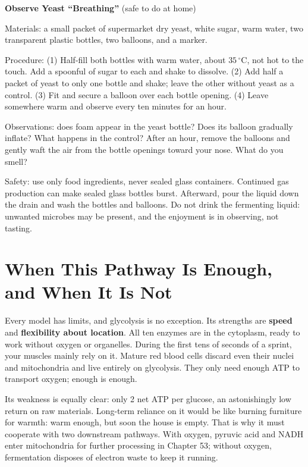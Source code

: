 \begin{shiyan}
\textbf{Observe Yeast ``Breathing''} (safe to do at home)

Materials: a small packet of supermarket dry yeast, white sugar, warm water, two transparent plastic bottles, two balloons, and a marker.

Procedure: (1) Half-fill both bottles with warm water, about $35\,^{\circ}\mathrm{C}$, not hot to the touch. Add a spoonful of sugar to each and shake to dissolve. (2) Add half a packet of yeast to only one bottle and shake; leave the other without yeast as a control. (3) Fit and secure a balloon over each bottle opening. (4) Leave somewhere warm and observe every ten minutes for an hour.

Observations: does foam appear in the yeast bottle? Does its balloon gradually inflate? What happens in the control? After an hour, remove the balloons and gently waft the air from the bottle openings toward your nose. What do you smell?

Safety: use only food ingredients, never sealed glass containers. Continued gas production can make sealed glass bottles burst. Afterward, pour the liquid down the drain and wash the bottles and balloons. Do not drink the fermenting liquid: unwanted microbes may be present, and the enjoyment is in observing, not tasting.
\end{shiyan}

\section{When This Pathway Is Enough, and When It Is Not}

Every model has limits, and glycolysis is no exception. Its strengths are \textbf{speed} and \textbf{flexibility about location}. All ten enzymes are in the cytoplasm, ready to work without oxygen or organelles. During the first tens of seconds of a sprint, your muscles mainly rely on it. Mature red blood cells discard even their nuclei and mitochondria and live entirely on glycolysis. They only need enough ATP to transport oxygen; enough is enough.

Its weakness is equally clear: only 2 net ATP per glucose, an astonishingly low return on raw materials. Long-term reliance on it would be like burning furniture for warmth: warm enough, but soon the house is empty. That is why it must cooperate with two downstream pathways. With oxygen, pyruvic acid and NADH enter mitochondria for further processing in Chapter 53; without oxygen, fermentation disposes of electron waste to keep it running.

